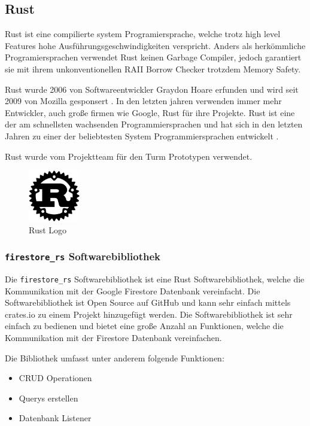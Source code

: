 \subsection{Rust}
\label{sec:rust}

Rust ist eine compilierte system Programiersprache, welche trotz high level Features hohe Ausführungsgeschwindigkeiten verspricht. Anders als herkömmliche Programiersprachen verwendet Rust keinen Garbage Compiler, jedoch garantiert sie mit ihrem unkonventionellen \ac{RAII} Borrow Checker trotzdem Memory Safety.


Rust wurde 2006 von Softwareentwickler Graydon Hoare erfunden und wird seit 2009 von Mozilla gesponsert . In den letzten jahren verwenden immer mehr Entwickler, auch große firmen wie Google, Rust für ihre Projekte. Rust ist eine der am schnellsten wachsenden Programmiersprachen und hat sich in den letzten Jahren zu einer der beliebtesten System Programmiersprachen entwickelt .

Rust wurde vom Projektteam für den Turm Prototypen verwendet.

\begin{figure}[H]
    \centering
    \includegraphics[width=0.20\textwidth]{images/rust_logo.png}
    \caption{Rust Logo}
    \label{fig:rust_logo}
\end{figure}

\subsubsection{\texttt{firestore\_rs} Softwarebibliothek}
\label{sec:firestore_rs}

Die \texttt{firestore\_rs} Softwarebibliothek ist eine Rust Softwarebibliothek, welche die Kommunikation mit der Google Firestore Datenbank vereinfacht. Die Softwarebibliothek ist Open Source auf GitHub und kann sehr einfach mittels crates.io zu einem Projekt hinzugefügt werden. Die Softwarebibliothek ist sehr einfach zu bedienen und bietet eine große Anzahl an Funktionen, welche die Kommunikation mit der Firestore Datenbank vereinfachen.

Die Bibliothek umfasst unter anderem folgende Funktionen:
\begin{itemize}
    \item \ac{CRUD} Operationen
    \item Querys erstellen
    \item Datenbank Listener
\end{itemize}

